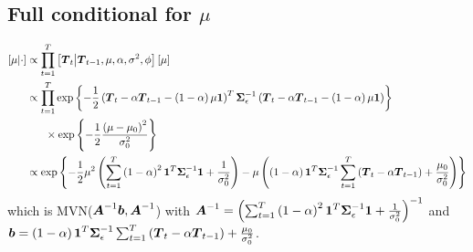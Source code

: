 \documentclass{article}\usepackage[]{graphicx}\usepackage[]{color}
\def\bm#1{\mbox{\boldmath $#1$}}
\begin{document}
\subsection{Full conditional for $\mu$}
%
\begin{align*}
%
\left[ \mu \middle| \cdot \right] & \propto \prod_{t = 1}^T \left[ \bm{T}_t \middle| \bm{T}_{t - 1}, \mu, \alpha, \sigma^2, \phi \right] \left[ \mu \right] \\
%
& \propto \prod_{t = 1}^T \exp{ \left\{ - \frac{1} {2} \left( \bm{T}_t  - \alpha \bm{T}_{t - 1} - \left( 1 - \alpha \right) \mu \bm{1} \right)^T \bm{\Sigma}_\epsilon^{ - 1} \left( \bm{T}_t  - \alpha \bm{T}_{t - 1} - \left( 1 - \alpha \right) \mu \bm{1} \right) \right\} }\\
& \hspace{6mm} \times \exp{ \left\{ - \frac{1} {2} \frac{\left( \mu - \mu_0 \right)^2} {\sigma^2_0} \right\} }\\
%
& \propto \exp{ \left\{ - \frac{1} {2} \mu^2 \left( \sum_{t = 1}^T \left( 1 - \alpha \right)^2 \bm{1}^T \bm{\Sigma}_\epsilon^{ - 1} \bm{1} + \frac{1} {\sigma^2_0} \right) - \mu \left( \left( 1 - \alpha \right) \bm{1}^T \bm{\Sigma}_\epsilon^{ - 1} \sum_{t = 1}^T \left( \bm{T}_t - \alpha \bm{T}_{t - 1} \right) + \frac{\mu_0} {\sigma^2_0} \right) \right\} }\\
%
\end{align*}
%
which is MVN($\bm{A}^{ - 1}\bm{b}, \bm{A}^{ - 1}$) with $\bm{A}^{ - 1} = \left( \sum_{t = 1}^T \left( 1 - \alpha \right)^2 \bm{1}^T \bm{\Sigma}_\epsilon^{ - 1} \bm{1} + \frac{1} {\sigma^2_0} \right)^{ - 1}$ and $\bm{b} = \left( 1 - \alpha \right) \bm{1}^T \bm{\Sigma}_\epsilon^{ - 1} \sum_{t = 1}^T \left( \bm{T}_t - \alpha \bm{T}_{t - 1} \right) + \frac{\mu_0} {\sigma^2_0}$.
%
%
\end{document}
